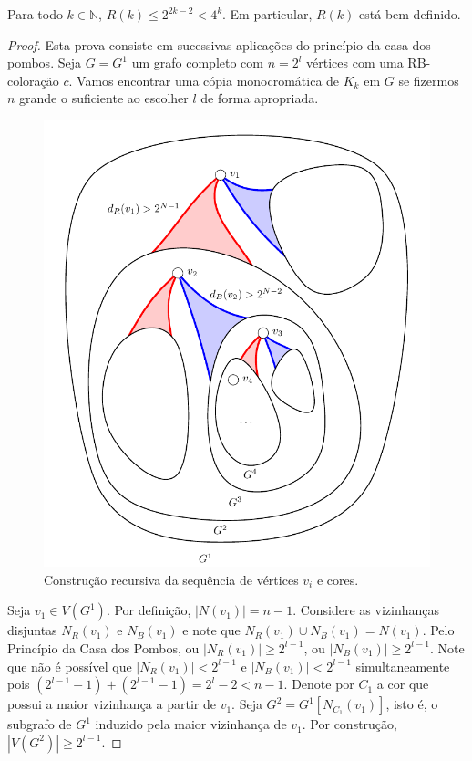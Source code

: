 \begin{theorem}[Ramsey 1930]
\label{thm:intro:ramsey}
Para todo $k \in \mathbb{N}$, $R(k) \leq 2^{2k-2} < 4^k $. Em particular, $R(k)$ está bem definido.
\end{theorem}
\begin{proof}
Esta prova consiste em sucessivas aplicações do princípio da casa dos pombos. Seja $G = G^1$ um grafo completo com $n = 2^{l}$ vértices com uma RB-coloração $c$. Vamos encontrar uma cópia monocromática de $K_k$ em $G$ se fizermos $n$ grande o suficiente ao escolher $l$ de forma apropriada.

\begin{figure}[ht!]
\centering
\includegraphics[width=0.9\linewidth]{figures/1_intro_6_recursive}
\caption{Construção recursiva da sequência de vértices $v_i$ e cores.}
\label{fig:intro:recursive}
\end{figure}

Seja $v_1 \in V(G^1)$. Por definição, $|N(v_1)| = n-1$. Considere as vizinhanças disjuntas $N_R(v_1)$ e $N_B(v_1)$ e note que $N_R(v_1) \cup N_B(v_1) = N(v_1)$. Pelo Princípio da Casa dos Pombos, ou $|N_R(v_1)| \geq 2^{l-1}$, ou $|N_B(v_1)| \geq 2^{l-1}$.
Note que não é possível que $|N_R(v_1)| < 2^{l-1}$ e $|N_B(v_1)| < 2^{l-1}$ simultaneamente pois $(2^{l-1} - 1) + (2^{l-1} - 1)  = 2^l - 2 < n - 1$.
Denote por $C_1$ a cor que possui a maior vizinhança a partir de $v_1$. Seja $G^2 = G^1[N_{C_1}(v_1)]$, isto é, o subgrafo de $G^1$ induzido pela maior vizinhança de $v_1$. Por construção, $|V(G^2)| \geq 2^{l - 1}$.


\end{proof}
